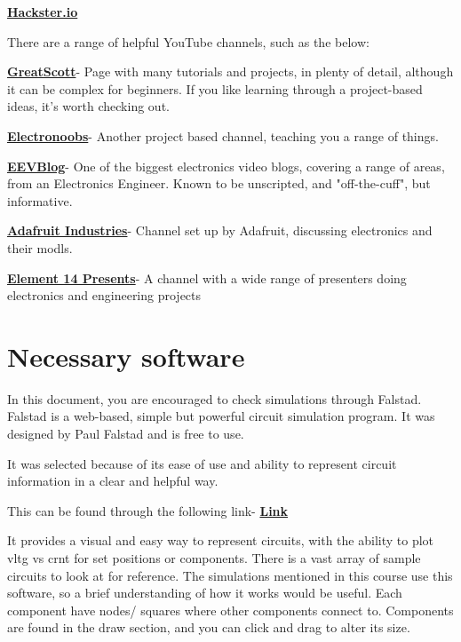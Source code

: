 \documentclass[a4paper,11pt]{report}
\let\oldhref\href %
\renewcommand{\href}[2]{\oldhref{#1}{\bfseries#2}}
\begin{document}
\href{https://www.hackster.io/}{Hackster.io}

There are a range of helpful YouTube channels, such as the below:

\href{https://www.youtube.com/c/greatscottlab}{GreatScott}- Page with many tutorials and projects, in plenty of detail, although it can be complex for beginners. If you like learning through a project-based ideas, it's worth checking out.

\href{https://www.youtube.com/c/ELECTRONOOBS}{Electronoobs}- Another project based channel, teaching you a range of things.

\href{https://www.youtube.com/c/EevblogDave}{EEVBlog}- One of the biggest electronics video blogs, covering a range of areas, from an Electronics Engineer. Known to be unscripted, and "off-the-cuff", but informative.

\href{https://www.youtube.com/c/adafruit}{Adafruit Industries}- Channel set up by Adafruit, discussing electronics and their \gls{modl}s.

\href{https://www.youtube.com/c/element14presents/videos}{Element 14 Presents}- A channel with a wide range of presenters doing electronics and engineering projects

\pagebreak

\section{Necessary software}

In this document, you are encouraged to check simulations through Falstad. Falstad is a web-based, simple but powerful circuit simulation program. It was designed by Paul Falstad and is free to use.

It was selected because of its ease of use and ability to represent circuit information in a clear and helpful way.

This can be found through the following link- \href{https://falstad.com/circuit/}{Link}

It provides a visual and easy way to represent circuits, with the ability to plot \gls{vltg} vs \gls{crnt} for set positions or components. There is a vast array of sample circuits to look at for reference. The simulations mentioned in this course use this software, so a brief understanding of how it works would be useful. Each component have nodes/ squares where other components connect to. Components are found in the draw section, and you can click and drag to alter its size.
\end{document}
